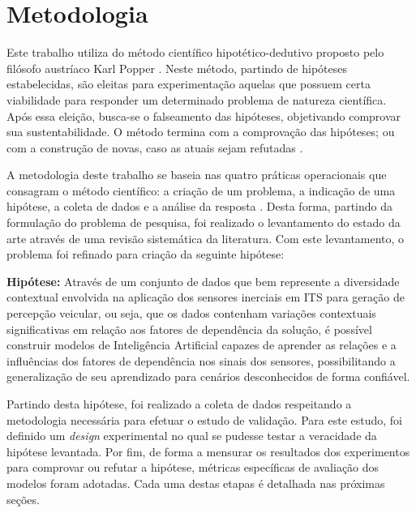 \chapter{Metodologia}
\label{cap:metodologia}

Este trabalho utiliza do método científico hipotético-dedutivo proposto pelo filósofo austríaco Karl Popper \cite{Popper2002}. Neste método, partindo de hipóteses estabelecidas, são eleitas para experimentação aquelas que possuem certa viabilidade para responder um determinado problema de natureza científica. Após essa eleição, busca-se o falseamento das hipóteses, objetivando comprovar sua sustentabilidade. O método termina com a comprovação das hipóteses; ou com a construção de novas, caso as atuais sejam refutadas \cite{Bonat2009}.

A metodologia deste trabalho se baseia nas quatro práticas operacionais que consagram o método científico: a criação de um problema, a indicação de uma hipótese, a coleta de dados e a análise da resposta \cite{Bonat2009}. Desta forma, partindo da formulação do problema de pesquisa, foi realizado o levantamento do estado da arte através de uma revisão sistemática da literatura. Com este levantamento, o problema foi refinado para criação da seguinte hipótese: 

\begin{description}
\item{\textbf{Hipótese:}} Através de um conjunto de dados que bem represente a diversidade contextual envolvida na aplicação dos sensores inerciais em ITS para geração de percepção veicular, ou seja, que os dados contenham variações contextuais significativas em relação aos fatores de dependência da solução, é possível construir modelos de Inteligência Artificial capazes de aprender as relações e a influências dos fatores de dependência nos sinais dos sensores, possibilitando a generalização de seu aprendizado para cenários desconhecidos de forma confiável.
\end{description}

Partindo desta hipótese, foi realizado a coleta de dados respeitando a metodologia necessária para efetuar o estudo de validação. Para este estudo, foi definido um \textit{design} experimental no qual se pudesse testar a veracidade da hipótese levantada. Por fim, de forma a mensurar os resultados dos experimentos para comprovar ou refutar a hipótese, métricas específicas de avaliação dos modelos foram adotadas. Cada uma destas etapas é detalhada nas próximas seções.

